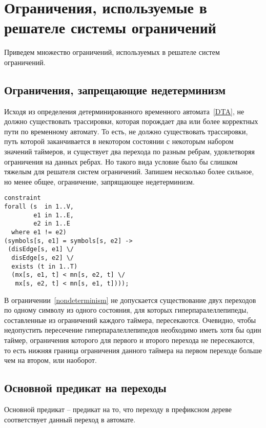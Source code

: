 \documentclass[times,specification,annotation]{itmo-student-thesis}
\begin{document}
\section{Ограничения, используемые в решателе системы ограничений}

Приведем множество ограничений, используемых в решателе систем ограничений.

\subsection{Ограничения, запрещающие недетерминизм}

Исходя из определения детерминированного временного автомата~\ref{DTA}, не должно существовать трассировки, которая порождает два или более корректных пути по временному автомату.
То есть, не должно существовать трассировки, путь которой заканчивается в некотором состоянии с некоторым набором значений таймеров, и существует два перехода по разным ребрам,
удовлетворяя ограничения на данных ребрах. Но такого вида условие было бы слишком тяжелым для решателя систем ограничений. Запишем несколько более сильное, но менее общее, ограничение, запрящающее
недетерминизм.

\begin{lstlisting}[float=!h,language=Mzn,caption={Ограничение, запрещающее недетерминизм},label={nondeterminism}]
constraint
forall (s  in 1..V,
        e1 in 1..E,
        e2 in 1..E
  where e1 != e2)
(symbols[s, e1] = symbols[s, e2] -> 
 (disEdge[s, e1] \/
  disEdge[s, e2] \/
  exists (t in 1..T) 
  (mx[s, e1, t] < mn[s, e2, t] \/ 
   mx[s, e2, t] < mn[s, e1, t])));
\end{lstlisting}

В ограничении~\ref{nondeterminism} не допускается существование двух переходов по одному символу из одного состояния, для которых гиперпаралеллепипеды, составленные из ограничений каждого таймера,
пересекаются. Очевидно, чтобы недопустить пересечение гиперпаралеллепипедов необходимо иметь хотя бы один таймер, ограничения которого для первого и второго перехода не пересекаются, то есть
нижняя граница ограничения данного таймера на первом переходе больше чем на втором, или наоборот.

\subsection{Основной предикат на переходы}

Основной предикат -- предикат на то, что переходу в префиксном дереве соответствует данный переход в автомате.
\end{document}

